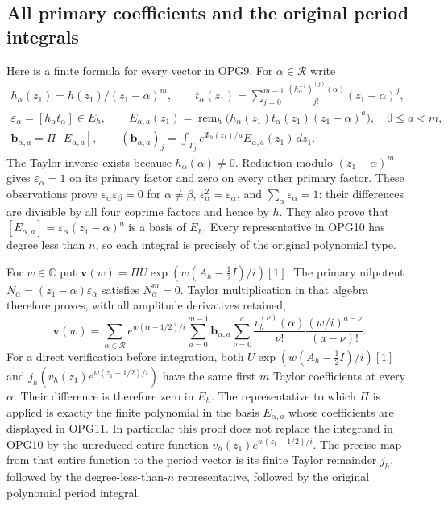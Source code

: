 \documentclass[11pt,a4paper]{article}
\begin{document}
\subsection{All primary coefficients and the original period integrals}
Here is a finite formula for every vector in OPG9. For
$\alpha\in\mathcal R$ write
\[
\begin{gathered}
 h_\alpha(z_1)=h(z_1)/(z_1-\alpha)^m,\qquad
 t_\alpha(z_1)=\sum_{j=0}^{m-1}
       \frac{(h_\alpha^{-1})^{(j)}(\alpha)}{j!}(z_1-\alpha)^j,\\
 \varepsilon_\alpha=[h_\alpha t_\alpha]\in E_h,
 \qquad E_{\alpha,a}(z_1)=
   \operatorname{rem}_h\bigl(h_\alpha(z_1)t_\alpha(z_1)
                                  (z_1-\alpha)^a\bigr),\quad0\leq a<m,\\
 \mathbf b_{\alpha,a}=\Pi[E_{\alpha,a}],\qquad
 (\mathbf b_{\alpha,a})_j=
   \int_{\Gamma_j}e^{\Phi_h(z_1)/u}E_{\alpha,a}(z_1)\,dz_1.
\end{gathered}\tag{OPG10}
\]
The Taylor inverse exists because $h_\alpha(\alpha)\ne0$.
Reduction modulo $(z_1-\alpha)^m$ gives
$\varepsilon_\alpha=1$ on its primary factor and zero on every
other primary factor. These observations prove
$\varepsilon_\alpha\varepsilon_\beta=0$ for $\alpha\ne\beta$,
$\varepsilon_\alpha^2=\varepsilon_\alpha$, and
$\sum_\alpha\varepsilon_\alpha=1$: their differences are divisible
by all four coprime factors and hence by $h$. They also prove that
$[E_{\alpha,a}]=\varepsilon_\alpha(z_1-\alpha)^a$ is a basis of
$E_h$. Every representative in OPG10 has degree less than $n$,
so each integral is precisely of the original polynomial type.

For $w\in\mathbb C$ put
$\mathbf v(w)=\Pi U\exp(w(A_h-\tfrac12I)/i)[1]$.
The primary nilpotent $N_\alpha=(z_1-\alpha)\varepsilon_\alpha$
satisfies $N_\alpha^m=0$. Taylor multiplication in that algebra
therefore proves, with all amplitude derivatives retained,
\[
\boxed{
 \mathbf v(w)=\sum_{\alpha\in\mathcal R}
 e^{w(\alpha-1/2)/i}\sum_{a=0}^{m-1}\mathbf b_{\alpha,a}
       \sum_{\nu=0}^{a}
       \frac{v_h^{(\nu)}(\alpha)}{\nu!}
       \frac{(w/i)^{a-\nu}}{(a-\nu)!}.
}\tag{OPG11}
\]
For a direct verification before integration, both
$U\exp(w(A_h-\tfrac12I)/i)[1]$ and
$j_h(v_h(z_1)e^{w(z_1-1/2)/i})$ have the same first $m$ Taylor
coefficients at every $\alpha$. Their difference is therefore
zero in $E_h$. The representative to which $\Pi$ is applied is
exactly the finite polynomial in the basis $E_{\alpha,a}$ whose
coefficients are displayed in OPG11. In particular this proof
does not replace the integrand in OPG10 by the unreduced entire
function $v_h(z_1)e^{w(z_1-1/2)/i}$. The precise map from that
entire function to the period vector is its finite Taylor
remainder $j_h$, followed by the degree-less-than-$n$ representative,
followed by the original polynomial period integral.
\end{document}
